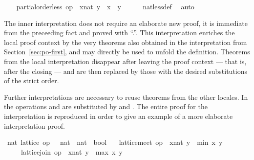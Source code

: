 \begin{isabellebody}
\isanewline
\ \ \isamarkupfalse%
\ {\isachardoublequoteopen}partial{\isacharunderscore}order{\isachardot}less\ {\isacharparenleft}op\ {\isasymle}{\isacharparenright}\ {\isacharparenleft}x{\isacharcolon}{\isacharcolon}nat{\isacharparenright}\ y\ {\isacharequal}\ {\isacharparenleft}x\ {\isacharless}\ y{\isacharparenright}{\isachardoublequoteclose}\isanewline
\ \ \ \ \isamarkupfalse%
\ nat{\isachardot}less{\isacharunderscore}def\ \isamarkupfalse%
\ auto\isanewline
{}\isamarkupfalse%
%
\endisatagvisible
{\isafoldvisible}%
%
\isadelimvisible
%
\endisadelimvisible
%
\begin{isamarkuptext}%
The inner interpretation does not require an
  elaborate new proof, it is immediate from the preceeding fact and
  proved with ``.''.
  This interpretation enriches the local proof context by
  the very theorems also obtained in the interpretation from
  Section~\ref{sec:po-first}, and  may directly be
  used to unfold the definition.  Theorems from the local
  interpretation disappear after leaving the proof context --- that
  is, after the closing  --- and are
  then replaced by those with the desired substitutions of the strict
  order.%
\end{isamarkuptext}%
\isamarkuptrue%
%
\isamarkuptrue%
%
\begin{isamarkuptext}%
Further interpretations are necessary to reuse theorems from
  the other locales.  In  the operations \isa{{\isasymsqinter}} and
  \isa{{\isasymsqunion}} are substituted by  and
  .  The entire proof for the
  interpretation is reproduced in order to give an example of a more
  elaborate interpretation proof.%
\end{isamarkuptext}%
\isamarkuptrue%
%
\isadelimvisible
%
\endisadelimvisible
%
\isatagvisible
{}\isamarkupfalse%
\ nat{\isacharcolon}\ lattice\ {\isachardoublequoteopen}op\ {\isasymle}\ {\isacharcolon}{\isacharcolon}\ nat\ {\isasymRightarrow}\ nat\ {\isasymRightarrow}\ bool{\isachardoublequoteclose}\isanewline
\ \ \ {\isachardoublequoteopen}lattice{\isachardot}meet\ op\ {\isasymle}\ {\isacharparenleft}x{\isacharcolon}{\isacharcolon}nat{\isacharparenright}\ y\ {\isacharequal}\ min\ x\ y{\isachardoublequoteclose}\isanewline
\ \ \ \ \ {\isachardoublequoteopen}lattice{\isachardot}join\ op\ {\isasymle}\ {\isacharparenleft}x{\isacharcolon}{\isacharcolon}nat{\isacharparenright}\ y\ {\isacharequal}\ max\ x\ y{\isachardoublequoteclose}\isanewline

\end{isabellebody}
